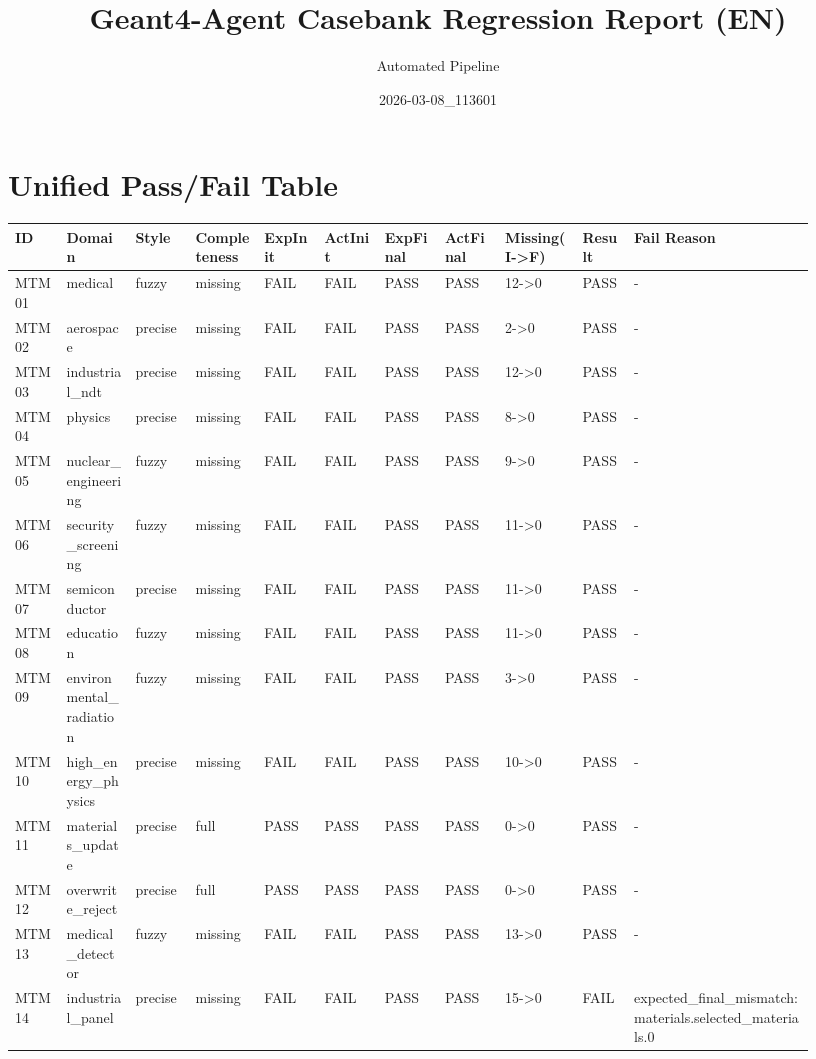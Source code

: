 \documentclass[11pt]{ctexart}
\title{Geant4-Agent Casebank Regression Report (EN)}
\author{Automated Pipeline}
\date{2026-03-08\_113601}
\begin{document}
\maketitle
\section{Unified Pass/Fail Table}
\begin{longtable}{p{0.06\linewidth}p{0.08\linewidth}p{0.07\linewidth}p{0.08\linewidth}p{0.07\linewidth}p{0.07\linewidth}p{0.07\linewidth}p{0.07\linewidth}p{0.09\linewidth}p{0.06\linewidth}p{0.21\linewidth}}
\toprule
ID & Domain & Style & Completeness & ExpInit & ActInit & ExpFinal & ActFinal & Missing(I->F) & Result & Fail Reason \\
\midrule
MTM01 & medical & fuzzy & missing & FAIL & FAIL & PASS & PASS & 12->0 & PASS & - \\
MTM02 & aerospace & precise & missing & FAIL & FAIL & PASS & PASS & 2->0 & PASS & - \\
MTM03 & industrial\_ndt & precise & missing & FAIL & FAIL & PASS & PASS & 12->0 & PASS & - \\
MTM04 & physics & precise & missing & FAIL & FAIL & PASS & PASS & 8->0 & PASS & - \\
MTM05 & nuclear\_engineering & fuzzy & missing & FAIL & FAIL & PASS & PASS & 9->0 & PASS & - \\
MTM06 & security\_screening & fuzzy & missing & FAIL & FAIL & PASS & PASS & 11->0 & PASS & - \\
MTM07 & semiconductor & precise & missing & FAIL & FAIL & PASS & PASS & 11->0 & PASS & - \\
MTM08 & education & fuzzy & missing & FAIL & FAIL & PASS & PASS & 11->0 & PASS & - \\
MTM09 & environmental\_radiation & fuzzy & missing & FAIL & FAIL & PASS & PASS & 3->0 & PASS & - \\
MTM10 & high\_energy\_physics & precise & missing & FAIL & FAIL & PASS & PASS & 10->0 & PASS & - \\
MTM11 & materials\_update & precise & full & PASS & PASS & PASS & PASS & 0->0 & PASS & - \\
MTM12 & overwrite\_reject & precise & full & PASS & PASS & PASS & PASS & 0->0 & PASS & - \\
MTM13 & medical\_detector & fuzzy & missing & FAIL & FAIL & PASS & PASS & 13->0 & PASS & - \\
MTM14 & industrial\_panel & precise & missing & FAIL & FAIL & PASS & PASS & 15->0 & FAIL & expected\_final\_mismatch:materials.selected\_materials.0 \\

\end{longtable}
\end{document}
